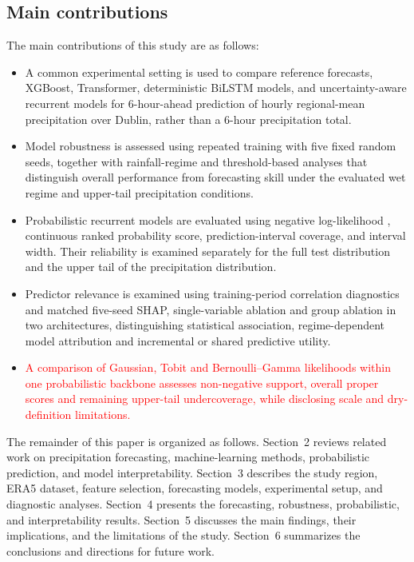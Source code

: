 \subsection{Main contributions}

The main contributions of this study are as follows:

\begin{itemize}
    \item A common experimental setting is used to compare reference forecasts, XGBoost, Transformer, deterministic BiLSTM models, and uncertainty-aware recurrent models for 6-hour-ahead prediction of hourly regional-mean precipitation over Dublin, rather than a 6-hour precipitation total.

    \item Model robustness is assessed using repeated training with five fixed random seeds, together with rainfall-regime and threshold-based analyses that distinguish overall performance from forecasting skill under the evaluated wet regime and upper-tail precipitation conditions.

    \item Probabilistic recurrent models are evaluated using negative log-likelihood , continuous ranked probability score, prediction-interval coverage, and interval width. Their reliability is examined separately for the full test distribution and the upper tail of the precipitation distribution.

    \item Predictor relevance is examined using training-period correlation diagnostics and matched five-seed SHAP, single-variable ablation and group ablation in two architectures, distinguishing statistical association, regime-dependent model attribution and incremental or shared predictive utility.
    \item \textcolor{red}{A comparison of Gaussian, Tobit and Bernoulli--Gamma likelihoods within one probabilistic backbone assesses non-negative support, overall proper scores and remaining upper-tail undercoverage, while disclosing scale and dry-definition limitations.}
\end{itemize}

The remainder of this paper is organized as follows. Section~2 reviews related work on precipitation forecasting, machine-learning methods, probabilistic prediction, and model interpretability. Section~3 describes the study region, ERA5 dataset, feature selection, forecasting models, experimental setup, and diagnostic analyses. Section~4 presents the forecasting, robustness, probabilistic, and interpretability results. Section~5 discusses the main findings, their implications, and the limitations of the study. Section~6 summarizes the conclusions and directions for future work.

